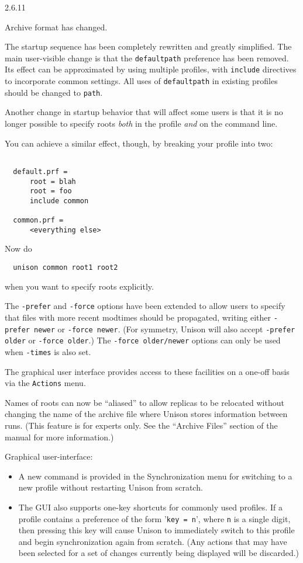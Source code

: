 \begin{changesfromversion}{2.6.11}
\item \incompatible{} Archive format has changed.

\item \incompatible{} The startup sequence has been completely rewritten
and greatly simplified.  The main user-visible change is that the
\verb|defaultpath| preference has been removed.  Its effect can be
approximated by using multiple profiles, with \verb|include| directives
to incorporate common settings.  All uses of \verb|defaultpath| in
existing profiles should be changed to \verb|path|.

Another change in startup behavior that will affect some users is that it
is no longer possible to specify roots {\em both} in the profile {\em
  and} on the command line.

You can achieve a similar effect, though, by breaking your profile into
two:
\begin{verbatim}

  default.prf =
      root = blah
      root = foo
      include common

  common.prf =
      <everything else>
\end{verbatim}
Now do
\begin{verbatim}
  unison common root1 root2
\end{verbatim}
when you want to specify roots explicitly.

\item The \verb|-prefer| and \verb|-force| options have been extended to
allow users to specify that files with more recent modtimes should be
propagated, writing either \verb|-prefer newer| or \verb|-force newer|.
(For symmetry, Unison will also accept \verb|-prefer older| or
\verb|-force older|.)  The \verb|-force older/newer| options can only be
used when \verb|-times| is also set.

The graphical user interface provides access to these facilities on a
one-off basis via the \verb|Actions| menu.

\item Names of roots can now be ``aliased'' to allow replicas to be
relocated without changing the name of the archive file where Unison
stores information between runs.  (This feature is for experts only.  See
the ``Archive Files'' section of the manual for more information.)

\item Graphical user-interface:
\begin{itemize}
\item A new command is provided in the Synchronization menu for
  switching to a new profile without restarting Unison from scratch.
\item The GUI also supports one-key shortcuts for commonly
used profiles.  If a profile contains a preference of the form
%
'\verb|key = n|', where \verb|n| is a single digit, then pressing this
key will cause Unison to immediately switch to this profile and begin
synchronization again from scratch.  (Any actions that may have been
selected for a set of changes currently being displayed will be
discarded.)


\end{itemize}
\end{changesfromversion}
